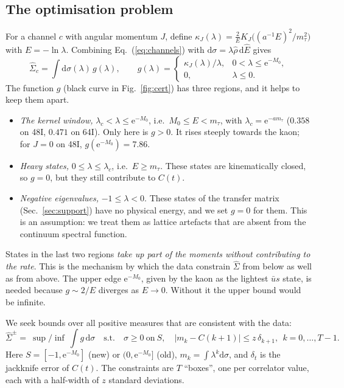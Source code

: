 \documentclass[11pt]{article}
\newcommand{\dd}{\mathrm{d}}
\newcommand{\ee}{\mathrm{e}}
\theoremstyle{remark}
\begin{document}
\subsection{The optimisation problem}\label{sec:problem}
For a channel $c$ with angular momentum $J$, define $\kappa_J(\lambda)=\frac{2}{E}K_J\big((a^{-1}E)^2/m_\tau^2\big)$ with $E=-\ln\lambda$. Combining
Eq.~(\ref{eq:channels}) with $\dd\sigma=\lambda\hat\rho\,\dd\hat E$ gives
\begin{equation}
 \hat\Sigma_c=\int\dd\sigma(\lambda)\,g(\lambda),\qquad g(\lambda)=\begin{cases}\kappa_J(\lambda)/\lambda,&0<\lambda\le\ee^{-M_0},\\ 0,&\lambda\le0.\end{cases}
 \label{eq:g}
\end{equation}
The function $g$ (black curve in Fig.~\ref{fig:cert}) has three regions, and it helps to keep them apart.
\begin{itemize}[leftmargin=*,itemsep=1pt]
\item \emph{The kernel window,} $\lambda_c<\lambda\le\ee^{-M_0}$, i.e.\ $M_0\le E<m_\tau$, with $\lambda_c=\ee^{-am_\tau}$ ($0.358$ on 48I, $0.471$ on 64I). Only here is $g>0$.
      It rises steeply towards the kaon; for $J=0$ on 48I, $g(\ee^{-M_0})=7.86$.
\item \emph{Heavy states,} $0\le\lambda\le\lambda_c$, i.e.\ $E\ge m_\tau$. These states are kinematically closed, so $g=0$, but they still contribute to $C(t)$.
\item \emph{Negative eigenvalues,} $-1\le\lambda<0$. These states of the transfer matrix (Sec.~\ref{sec:support}) have no physical energy, and we set $g=0$ for them.
      This is an assumption: we treat them as lattice artefacts that are absent from the continuum spectral function.
\end{itemize}
States in the last two regions \emph{take up part of the moments without contributing to the rate}. This is the mechanism by which the data constrain $\hat\Sigma$ from below as well as from above.
The upper edge $\ee^{-M_0}$, given by the kaon as the lightest $\bar us$ state, is needed because $g\sim2/E$ diverges as $E\to0$. Without it the upper bound would be infinite.

We seek bounds over all positive measures that are consistent with the data:
\begin{equation}
 \hat\Sigma^{\pm}=\ \sup/\inf\ \int g\,\dd\sigma\quad\text{s.t.}\quad \sigma\ge0\ \text{on}\ S,\quad |m_k-C(k+1)|\le z\,\delta_{k+1},\ \ k=0,\dots,T-1.
 \label{eq:primal}
\end{equation}
Here $S=[-1,\ee^{-M_0}]$ (new) or $(0,\ee^{-M_0}]$ (old), $m_k=\int\lambda^k\dd\sigma$, and $\delta_t$ is the jackknife error of $C(t)$.
The constraints are $T$ ``boxes'', one per correlator value, each with a half-width of $z$ standard deviations.
\end{document}
